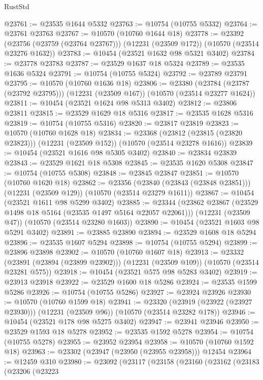 \begin{lexlean}{RustStd}
\begin{coremodule}
@23761 := @23535 @1644 @5332
@23763 := @10754 (@10755 @5332)
@23764 := @23761 @23763
@23767 := @10570 (@10760 @1644 @18)
@23778 := @23392
    (@23756 (@23759 (@23764 @23767)))
    (@12231 (@23509 @172))
    (@10570 (@23514 @23276 @1632))
@23783 := @10454 (@23521 @1632 @98 @5321 @3402)
@23784 := @23778 @23783
@23787 := @23529 @1637 @18 @5324
@23789 := @23535 @1636 @5324
@23791 := @10754 (@10755 @5324)
@23792 := @23789 @23791
@23795 := @10570 (@10760 @1636 @18)
@23806 := @23380
    (@23784 (@23787 (@23792 @23795)))
    (@12231 (@23509 @167))
    (@10570 (@23514 @23277 @1624))
@23811 := @10454 (@23521 @1624 @98 @5313 @3402)
@23812 := @23806 @23811
@23815 := @23529 @1629 @18 @5316
@23817 := @23535 @1628 @5316
@23819 := @10754 (@10755 @5316)
@23820 := @23817 @23819
@23823 := @10570 (@10760 @1628 @18)
@23834 := @23368
    (@23812 (@23815 (@23820 @23823)))
    (@12231 (@23509 @152))
    (@10570 (@23514 @23278 @1616))
@23839 := @10454 (@23521 @1616 @98 @5305 @3402)
@23840 := @23834 @23839
@23843 := @23529 @1621 @18 @5308
@23845 := @23535 @1620 @5308
@23847 := @10754 (@10755 @5308)
@23848 := @23845 @23847
@23851 := @10570 (@10760 @1620 @18)
@23862 := @23356
    (@23840 (@23843 (@23848 @23851)))
    (@12231 (@23509 @129))
    (@10570 (@23514 @23279 @1611))
@23867 := @10454 (@23521 @1611 @98 @5299 @3402)
@23885 := @23344
    (@23862 @23867 (@23529 @1498 @18 @5164 (@23535 @1497 @5164 @22057 @22061)))
    (@12231 (@23509 @47))
    (@10570 (@23514 @23280 @1603))
@23890 := @10454 (@23521 @1603 @98 @5291 @3402)
@23891 := @23885 @23890
@23894 := @23529 @1608 @18 @5294
@23896 := @23535 @1607 @5294
@23898 := @10754 (@10755 @5294)
@23899 := @23896 @23898
@23902 := @10570 (@10760 @1607 @18)
@23913 := @23332
    (@23891 (@23894 (@23899 @23902)))
    (@12231 (@23509 @109))
    (@10570 (@23514 @23281 @575))
@23918 := @10454 (@23521 @575 @98 @5283 @3402)
@23919 := @23913 @23918
@23922 := @23529 @1600 @18 @5286
@23924 := @23535 @1599 @5286
@23926 := @10754 (@10755 @5286)
@23927 := @23924 @23926
@23930 := @10570 (@10760 @1599 @18)
@23941 := @23320
    (@23919 (@23922 (@23927 @23930)))
    (@12231 (@23509 @96))
    (@10570 (@23514 @23282 @178))
@23946 := @10454 (@23521 @178 @98 @5275 @3402)
@23947 := @23941 @23946
@23950 := @23529 @1593 @18 @5278
@23952 := @23535 @1592 @5278
@23954 := @10754 (@10755 @5278)
@23955 := @23952 @23954
@23958 := @10570 (@10760 @1592 @18)
@23963 := @23302 (@23947 (@23950 (@23955 @23958))) @12454
@23964 := @12459 @310
@23980 := @23092
    (@23117
      (@23158
        (@23160
          (@23162
            (@23183
              (@23206
                (@23223

\end{coremodule}
\end{lexlean}

